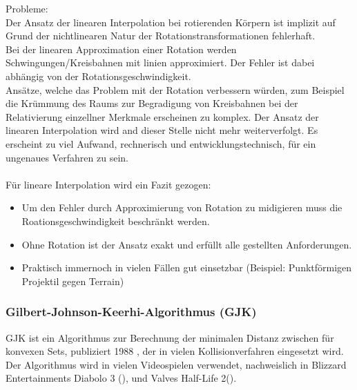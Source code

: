 Probleme:\\
Der Ansatz der linearen Interpolation bei rotierenden Körpern ist implizit auf Grund der nichtlinearen Natur der Rotationstransformationen fehlerhaft.\\
Bei der linearen Approximation einer Rotation werden Schwingungen/Kreisbahnen mit linien approximiert. Der Fehler ist dabei abhängig von der Rotationsgeschwindigkeit.\\
Ansätze, welche das Problem mit der Rotation verbessern würden, zum Beispiel die Krümmung des Raums zur Begradigung von Kreisbahnen bei der Relativierung einzellner Merkmale erscheinen zu komplex.
		Der Ansatz der linearen Interpolation wird and dieser Stelle nicht mehr weiterverfolgt. Es erscheint zu viel Aufwand, rechnerisch und entwicklungstechnisch, für ein ungenaues Verfahren zu sein.\\
\\
Für lineare Interpolation wird ein Fazit gezogen:
\begin{itemize}
	\item Um den Fehler durch Approximierung von Rotation zu midigieren muss die Roationsgeschwindigkeit beschränkt werden.
	\item Ohne Rotation ist der Ansatz exakt und erfüllt alle gestellten Anforderungen.
	\item Praktisch immernoch in vielen Fällen gut einsetzbar (Beispiel: Punktförmigen Projektil gegen Terrain)
\end{itemize}

\subsubsection{Gilbert-Johnson-Keerhi-Algorithmus (GJK)}
GJK ist ein Algorithmus zur Berechnung der minimalen Distanz zwischen für konvexen Sets, publiziert 1988 \cite{gjk}, der in vielen Kollisionverfahren eingesetzt wird.\\
		Der Algorithmus wird in vielen Videospielen verwendet, nachweislich in Blizzard Entertainments Diabolo 3 (\cite{gdc-physics}), und Valves Half-Life 2(\cite{gjk-blog}).\\
		

